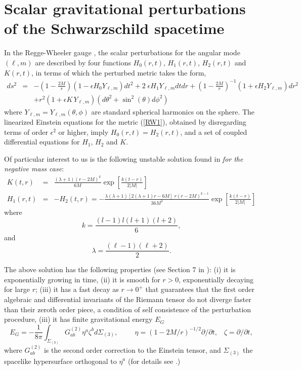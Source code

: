 \documentclass[aps,floats,showpacs,amssymb,tightenlines]{revtex4}
\def\e{\epsilon}
\begin{document}
\section{Scalar gravitational perturbations of the Schwarzschild spacetime}\label{rw}
  In the Regge-Wheeler gauge \cite{rw}, the scalar
perturbations for the angular mode $(\ell,m)$  are
described by  four functions $H_0(r,t)$, $H_1(r,t)$, $H_2(r,t)$ and
$K(r,t)$, in terms of which the perturbed metric takes the form,
\begin{eqnarray}
\label{RW1}
ds^2 & = & -\left(1-\frac{2M}{r}\right)\left(1- \e H_0 Y_{\ell,m}\right)dt^2 +
2  \; \e  H_1 Y_{\ell,m} dt dr+\left(1-\frac{2M}{r}\right)^{-1}\left(1+ \e H_2 Y_{\ell,m}\right)dr^2
\nonumber \\
& & +r^2\left(1+ \e  K\, Y_{\ell,m}\right) \left( d \theta^2 +  \sin^2(\theta)
d \phi^2 \right)
\end{eqnarray}
where  
$Y_{\ell,m}=  Y_{\ell,m}(\theta,\phi)$ are standard spherical
harmonics on the sphere.
The linearized Einstein equations for the
metric (\ref{RW1}), obtained by disregarding terms of order $\e^2$ or higher,
 imply $H_0(r,t)=H_2(r,t)$, and a set of coupled
differential equations for $H_1$, $H_2$ and $K$.

Of particular interest to us is the following unstable solution  found in \cite{dg}  {\em for the negative mass case}:
\begin{eqnarray}
\label{RW24a}
 K(t,r) & = & \frac{ (\lambda + 1)(r-2M)^{k }}{6M}\exp \left[\frac{k(t- r)}{2|M|}\right]   \\
 H_1(r,t) & = & -H_2(t,r) = -\frac{\lambda (\lambda+1)
   [2(\lambda+1) r-6M] \; r  (r-2M)^{k-1}}{36M^2}  \exp \left[\frac{k(t- r)}{2|M|}\right] \nonumber
\end{eqnarray}
where
\begin{equation} \label{k}
k =\frac{ (l-1) l (l+1) (l+2)} {6}  ,
\end{equation}
and
\begin{equation} \label{lam}
\lambda =  \frac{(\ell-1)(\ell+2)}{2} .
\end{equation}

The above solution has the following properties (see Section 7 in \cite{dg}): (i) it is exponentially growing in time, 
(ii) it is smooth for $r>0$,
 exponentially decaying for large $r$;
(iii) it has a fast decay as $r \to 0^+$ that guarantees that the first order algebraic and 
differential invariants of the Riemann
tensor do not diverge faster than their zeroth order piece, a condition 
of self consistence of the perturbation procedure, (iii)
it has finite gravitational energy $E_G$
\begin{equation} \label{eg}
E_G = - \frac{1}{8 \pi} \int_{\Sigma_{(3)}} G^{(2)}_{ab} \eta^a \zeta^b d
\Sigma_{(3)},\hspace{1cm}\eta = (1-2M/r)^{-1/2} \partial / \partial t,
\;\;\; \zeta = \partial / \partial t,
\end{equation}
where $G^{(2)}_{ab} $ is the second order correction to the Einstein
tensor, and $\Sigma_{(3)}$ the spacelike hypersurface orthogonal to $\eta^a$ (for details
see \cite{ghi,dg,chandra}.)
\end{document}

